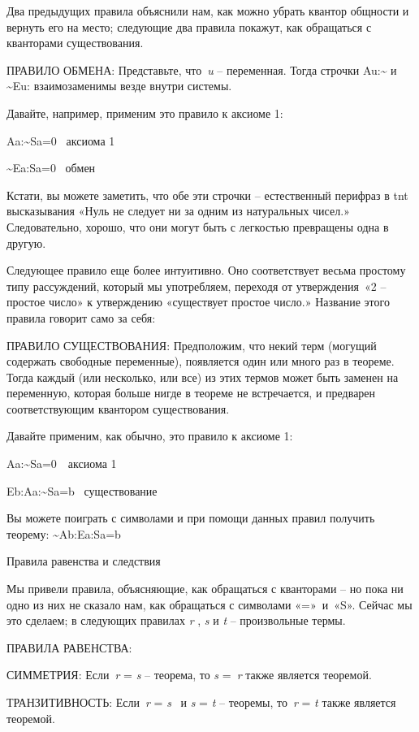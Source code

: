 \documentclass[../main.tex]{subfiles}
\begin{document}
Два предыдущих правила объяснили нам, как можно убрать квантор общности и вернуть его на место; следующие два правила покажут, как обращаться с кванторами существования.

ПРАВИЛО ОБМЕНА: Представьте, что~\emph{u} \--- переменная. Тогда строчки Au:\textasciitilde{} и \textasciitilde Eu: взаимозаменимы везде внутри системы.

Давайте, например, применим это правило к аксиоме 1:

Aa:\textasciitilde Sa=0~ аксиома 1

\textasciitilde Ea:Sa=0~ обмен

Кстати, вы можете заметить, что обе эти строчки \--- естественный перифраз в \acs{tnt} высказывания «Нуль не следует ни за одним из натуральных чисел.» Следовательно, хорошо, что они могут быть с легкостью превращены одна в другую.

Следующее правило еще более интуитивно. Оно соответствует весьма простому типу рассуждений, который мы употребляем, переходя от утверждения~«2 \--- простое число» к утверждению «существует простое число.» Название этого правила говорит само за себя:

ПРАВИЛО СУЩЕСТВОВАНИЯ: Предположим, что некий терм (могущий содержать свободные переменные), появляется один или много раз в теореме. Тогда каждый (или несколько, или все) из этих термов может быть заменен на переменную, которая больше нигде в теореме не встречается, и предварен соответствующим квантором существования.

Давайте применим, как обычно, это правило к аксиоме 1:

Aa:\textasciitilde Sa=0~~аксиома 1~

Eb:Aa:\textasciitilde Sa=b ~существование

Вы можете поиграть с символами и при помощи данных правил получить теорему: \textasciitilde Ab:Ea:Sa=b

Правила равенства и следствия

Мы привели правила, объясняющие, как обращаться с кванторами \--- но пока ни одно из них не сказало нам, как обращаться с символами «=»~и~«S». Сейчас мы это сделаем; в следующих правилах \emph{r} , \emph{s} и \emph{t} \--- произвольные термы.

ПРАВИЛА РАВЕНСТВА:

СИММЕТРИЯ: Если~\emph{r} = \emph{s} \--- теорема, то \emph{s} =~\emph{r} также является теоремой.

ТРАНЗИТИВНОСТЬ: Если~\emph{r} = \emph{s} ~и \emph{s} = \emph{t} \--- теоремы, то~\emph{r} = \emph{t} также является теоремой.
\end{document}
